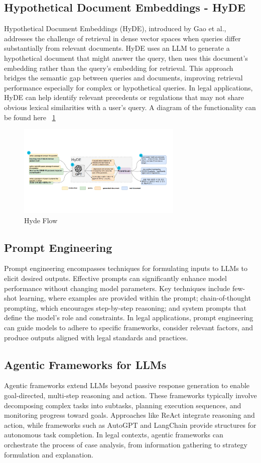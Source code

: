 \subsection{Hypothetical Document Embeddings - HyDE}
Hypothetical Document Embeddings (HyDE), introduced by Gao et al.\cite{gao2022}, 
addresses the challenge of retrieval in dense vector spaces when queries 
differ substantially from relevant documents. HyDE uses an LLM to generate a 
hypothetical document that might answer the query, then uses this document's embedding rather 
than the query's embedding for retrieval. This approach bridges the semantic gap between queries 
and documents, improving retrieval performance especially for complex or hypothetical queries. In legal 
applications, HyDE can help identify relevant precedents or regulations that may not share obvious lexical 
similarities with a user's query\cite{gao2022}.
A diagram of the functionality can be found here ~\ref{fig:hyde}
\begin{figure}[htbp]
    \centering
    \includegraphics[width=0.7\textwidth]{figures/HyDE.png}
    \caption{Hyde Flow \cite{gao2022precisezeroshotdenseretrieval}}
    \label{fig:hyde}
\end{figure}
\subsection{Prompt Engineering}
Prompt engineering encompasses techniques for formulating inputs to LLMs to 
elicit desired outputs. Effective prompts can significantly enhance model 
performance without changing model parameters. Key techniques include few-shot 
learning, where examples are provided within the prompt; chain-of-thought prompting, 
which encourages step-by-step reasoning; and system prompts that define the model's role 
and constraints. In legal applications, prompt engineering can guide models to adhere 
to specific frameworks, consider relevant factors, and produce outputs aligned with 
legal standards and practices.
\subsection{Agentic Frameworks for LLMs}
Agentic frameworks extend LLMs beyond passive response generation to enable goal-directed, 
multi-step reasoning and action. These frameworks typically involve decomposing complex 
tasks into subtasks, planning execution sequences, and monitoring progress toward goals. 
Approaches like ReAct integrate reasoning and action, while frameworks such
as AutoGPT and LangChain provide structures for autonomous task completion. 
In legal contexts, agentic frameworks can orchestrate the process of case analysis, 
from information gathering to strategy formulation and explanation.
